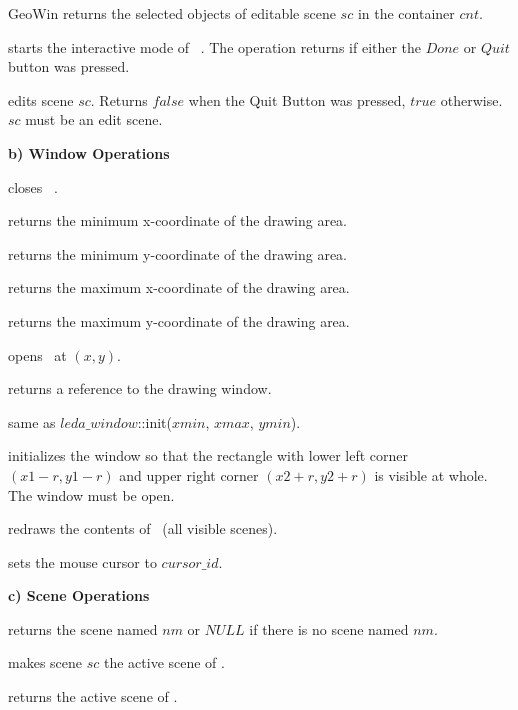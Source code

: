 \begin{ccRefClass}{GeoWin}
{returns the selected objects of editable scene $sc$ in the container $cnt$.} 
 
{starts the interactive mode of \ccVar\ . The operation returns if either the $Done$ or
$Quit$ button was pressed. }

{edits scene $sc$. Returns $false$ when the Quit Button was pressed,
$true$ otherwise. \ccPrecond $sc$ must be an edit scene. }

\medskip
{\bf b) Window Operations}

{closes \ccVar\ .}

{returns the minimum x-coordinate of the drawing area.}
  
{returns the minimum y-coordinate of the drawing area.}
  
{returns the maximum x-coordinate of the drawing area.}
    
{returns the maximum y-coordinate of the drawing area.} 

{opens \ccVar\ at $(x,y)$. }

{returns a reference to the drawing window.}
  
{same as $leda\_window$::init($xmin$, $xmax$, $ymin$).}
  
{initializes the window so that the rectangle with lower 
left corner $(x1-r,y1-r)$ and upper right corner $(x2+r,y2+r)$
is visible at whole. The window must be open.}

{redraws the contents of \ccVar\ (all visible scenes).}

{sets the mouse cursor to $cursor\_id$. }


{\bf c) Scene Operations} 

{returns the scene named $nm$ or $NULL$ if there is no scene
named $nm$.}

{makes scene $sc$ the active scene of \ccVar. }

{returns the active scene of \ccVar. }


\end{ccRefClass}
